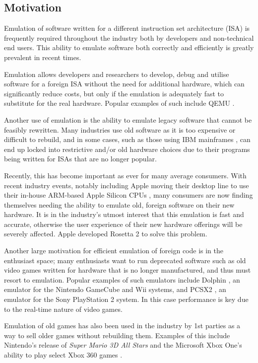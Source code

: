 \subsection{Motivation}

Emulation of software written for a different instruction set architecture (ISA) is frequently required throughout the industry both by developers and non-technical end users. This ability to emulate software both correctly and efficiently is greatly prevalent in recent times.

Emulation allows developers and researchers to develop, debug and utilise software for a foreign ISA without the need for additional hardware, which can significantly reduce costs, but only if the emulation is adequately fast to substitute for the real hardware. Popular examples of such include QEMU \cite{qemu}.

Another use of emulation is the ability to emulate legacy software that cannot be feasibly rewritten. Many industries use old software as it is too expensive or difficult to rebuild, and in some cases, such as those using IBM mainframes \cite{ibm-mainframe}, can end up locked into restrictive and/or old hardware choices due to their programs being written for ISAs that are no longer popular.

Recently, this has become important as ever for many average consumers. With recent industry events, notably including Apple moving their desktop line to use their in-house ARM-based Apple Silicon CPUs \cite{apple-silicon,rosetta2}, many consumers are now finding themselves needing the ability to emulate old, foreign software on their new hardware. It is in the industry's utmost interest that this emulation is fast and accurate, otherwise the user experience of their new hardware offerings will be severely affected. Apple developed Rosetta 2 \cite{rosetta2} to solve this problem.

Another large motivation for efficient emulation of foreign code is in the enthusiast space; many enthusiasts want to run deprecated software such as old video games written for hardware that is no longer manufactured, and thus must resort to emulation. Popular examples of such emulators include Dolphin \cite{dolphin}, an emulator for the Nintendo GameCube and Wii systems, and PCSX2 \cite{PCSX2}, an emulator for the Sony PlayStation 2 system. In this case performance is key due to the real-time nature of video games.

Emulation of old games has also been used in the industry by 1st parties as a way to sell older games without rebuilding them. Examples of this include Nintendo's release of \emph{Super Mario 3D All Stars} \cite{mario-emulation} and the Microsoft Xbox One's ability to play select Xbox 360 games \cite{xbox360-emulation}.

